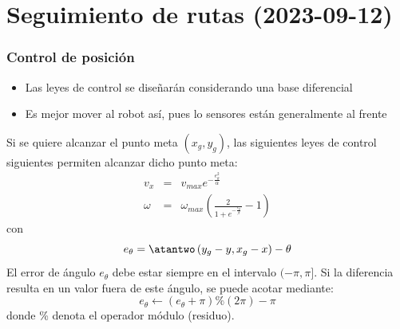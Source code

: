 \section{Seguimiento de rutas (2023-09-12)}

\begin{frame}\frametitle{Control de posición}
  \begin{itemize}
  \item Las leyes de control se diseñarán considerando una base diferencial
  \item Es mejor mover al robot así, pues lo sensores están generalmente al frente
  \end{itemize}
  Si se quiere alcanzar el punto meta $(x_g, y_g)$, las siguientes leyes de control siguientes permiten alcanzar dicho punto meta:
  \begin{eqnarray*}
  v_x    &=& v_{max}e^{-\frac{e_{\theta}^{2}}{\alpha}}\label{eq:Control11}\\
  \omega &=& \omega_{max}\left(\frac{2}{1+e^{-\frac{e_{\theta}}{\beta}}}-1\right)\label{eq:Control12}
  \end{eqnarray*}
  con
  \[e_{\theta} = \atantwo\left(y_g - y, x_g - x\right) - \theta\]
  El error de ángulo $e_\theta$ debe estar siempre en el intervalo $(-\pi, \pi]$. Si la diferencia resulta en un valor fuera de este ángulo, se puede acotar mediante:
  \[e_\theta \leftarrow \left(e_\theta + \pi\right)\% (2\pi) - \pi\]
  donde \% denota el operador módulo (residuo). 
\end{frame}

